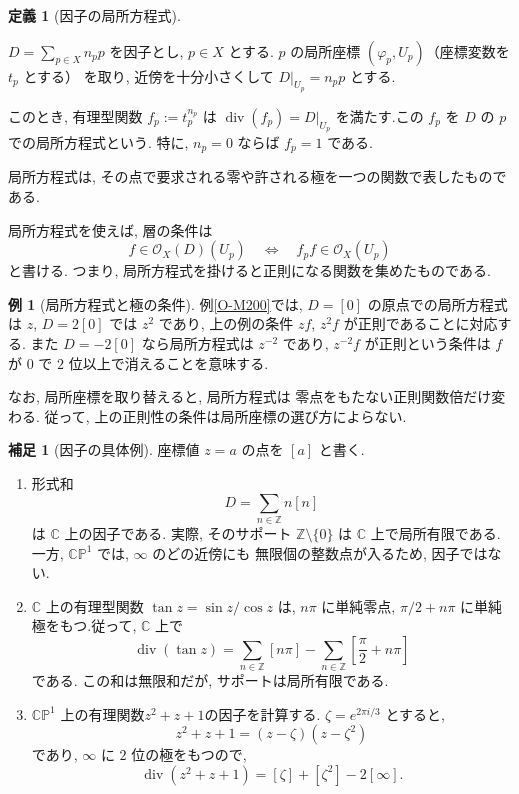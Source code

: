 \documentclass[dvipdfmx,a4paper,11pt]{article} %
\newcommand{\Z}{\mathbb{Z}}
\newcommand{\C}{\mathbb{C}}
\theoremstyle{definition}
\numberwithin{equation}{section}
\newtheorem{dfn}[thm]{定義}
\newtheorem{rem}[thm]{補足}
\newtheorem{exa}[thm]{例}
\begin{document}
\begin{dfn}[因子の局所方程式]\label{O-M201}

$D=\sum_{p\in X}n_p p$ を因子とし, $p\in X$ とする.
$p$ の局所座標 $(\varphi_p,U_p)$（座標変数を $t_p$ とする） を取り, 
近傍を十分小さくして $D|_{U_p}=n_p p$ とする. 

このとき, 有理型関数 $f_p:=t_p^{n_p}$ は $\operatorname{div}(f_p)=D|_{U_p}$ を満たす.この $f_p$ を $D$ の $p$ での局所方程式という.
特に, $n_p=0$ ならば $f_p=1$ である.
\end{dfn}
局所方程式は, その点で要求される零や許される極を一つの関数で表したものである.

局所方程式を使えば, 層の条件は
\[
f\in\mathcal O_X(D)(U_p)
\quad\Longleftrightarrow\quad
f_p f\in\mathcal O_X(U_p)
\]
と書ける.
つまり, 局所方程式を掛けると正則になる関数を集めたものである.

\begin{exa}[局所方程式と極の条件]
例\ref{O-M200}では, $D=[0]$ の原点での局所方程式は $z$, 
$D=2[0]$ では $z^2$ であり, 
上の例の条件 $zf$, $z^2f$ が正則であることに対応する.
また $D=-2[0]$ なら局所方程式は $z^{-2}$ であり,
$z^{-2}f$ が正則という条件は $f$ が $0$ で $2$ 位以上で消えることを意味する.
\end{exa}

なお, 局所座標を取り替えると, 局所方程式は
零点をもたない正則関数倍だけ変わる.
従って, 上の正則性の条件は局所座標の選び方によらない.

\begin{rem}[因子の具体例]\label{O-M202}
座標値 $z=a$ の点を $[a]$ と書く.
\begin{enumerate}
\item
形式和
\[
D=\sum_{n\in\Z}n[n]
\]
は $\C$ 上の因子である.
実際, そのサポート $\Z\setminus\{0\}$ は $\C$ 上で局所有限である.
一方, $\C\mathbb P^1$ では, $\infty$ のどの近傍にも
無限個の整数点が入るため, 因子ではない.

\item $\C$ 上の有理型関数
$\tan z=\sin z/\cos z$ は, $n\pi$ に単純零点, 
$\pi/2+n\pi$ に単純極をもつ.従って, $\C$ 上で
\[
\operatorname{div}(\tan z)
=\sum_{n\in\Z}[n\pi]
-\sum_{n\in\Z}\left[\frac{\pi}{2}+n\pi\right]
\]
である.
この和は無限和だが, サポートは局所有限である.

\item
$\C\mathbb P^1$ 上の有理関数$z^2+z+1$の因子を計算する.
$\zeta=e^{2\pi i/3}$ とすると, 
\[
z^2+z+1=(z-\zeta)(z-\zeta^2)
\]
であり, $\infty$ に $2$ 位の極をもつので, 
\[
\operatorname{div}(z^2+z+1)
=[\zeta]+[\zeta^2]-2[\infty].
\]
\end{enumerate}
\end{rem}
\end{document}
